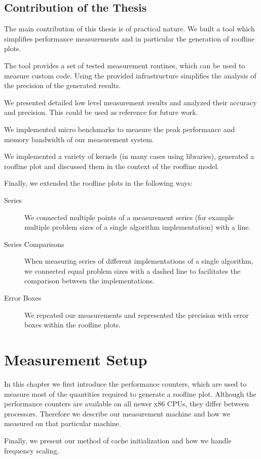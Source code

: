 \documentclass[a4paper,12pt]{report}
\begin{document}
\section{Contribution of the Thesis}
The main contribution of this thesis is of practical nature. We built a tool
which simplifies performance measurements and in particular the generation of
roofline plots.

The tool provides a set of tested measurement routines, which can be used
to measure custom code. Using the provided infrastructure simplifies the
analysis of the precision of the generated results.

We presented detailed low level measurement results and analyzed their accuracy
and precision. This could be used as reference for future work.

We implemented micro benchmarks to measure the peak performance and memory
bandwidth of our measurement system. 

 We implemented a variety of kernels (in many cases using
libraries), generated a roofline plot and discussed them in the context of the roofline
model.

Finally, we extended the roofline plots in the following ways: 
\begin{description}
\item[Series] We connected multiple points of a measurement series
(for example multiple problem sizes of a single algorithm implementation) with a line.
\item[Series Comparisons] When measuring series of different
implementations of a single algorithm, we connected equal problem sizes with a
dashed line to facilitates the comparison between the implementations.
\item[Error Boxes] We repeated our measurements and represented the precision
with error boxes within the roofline plots.
\end{description}

\chapter{Measurement Setup}
In this chapter we first introduce the performance counters, which are
used to measure most of the quantities required to generate a roofline
plot. Although the performance counters are available on all newer x86 CPUs,
they differ between processors. Therefore we describe our measurement
machine and how we measured on that particular machine.

Finally, we present our method of cache initialization and how we handle
frequency scaling.
 
\end{document}
